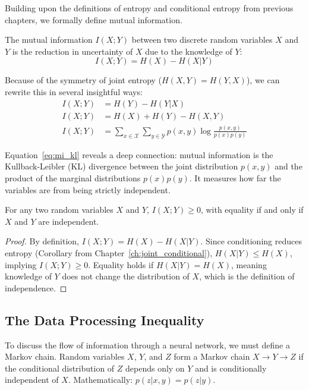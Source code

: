 Building upon the definitions of entropy and conditional entropy from previous chapters, we formally define mutual information.

\begin{definition}
The mutual information $I(X; Y)$ between two discrete random variables $X$ and $Y$ is the reduction in uncertainty of $X$ due to the knowledge of $Y$:
\begin{equation}
    I(X; Y) = H(X) - H(X|Y)
\end{equation}
\end{definition}

Because of the symmetry of joint entropy ($H(X,Y) = H(Y,X)$), we can rewrite this in several insightful ways:
\begin{align}
    I(X; Y) &= H(Y) - H(Y|X) \label{eq:mi_sym1} \\
    I(X; Y) &= H(X) + H(Y) - H(X, Y) \label{eq:mi_sym2} \\
    I(X; Y) &= \sum_{x \in \mathcal{X}} \sum_{y \in \mathcal{Y}} p(x, y) \log \frac{p(x, y)}{p(x)p(y)} \label{eq:mi_kl}
\end{align}

Equation~\ref{eq:mi_kl} reveals a deep connection: mutual information is the Kullback-Leibler (KL) divergence between the joint distribution $p(x,y)$ and the product of the marginal distributions $p(x)p(y)$. It measures how far the variables are from being strictly independent.

\begin{theorem}
For any two random variables $X$ and $Y$, $I(X;Y) \geq 0$, with equality if and only if $X$ and $Y$ are independent.
\end{theorem}
\begin{proof}
By definition, $I(X;Y) = H(X) - H(X|Y)$. Since conditioning reduces entropy (Corollary from Chapter~\ref{ch:joint_conditional}), $H(X|Y) \leq H(X)$, implying $I(X;Y) \geq 0$. Equality holds if $H(X|Y) = H(X)$, meaning knowledge of $Y$ does not change the distribution of $X$, which is the definition of independence.
\end{proof}

\subsection{The Data Processing Inequality}

To discuss the flow of information through a neural network, we must define a Markov chain. Random variables $X$, $Y$, and $Z$ form a Markov chain $X \to Y \to Z$ if the conditional distribution of $Z$ depends only on $Y$ and is conditionally independent of $X$. Mathematically: $p(z|x,y) = p(z|y)$. 

